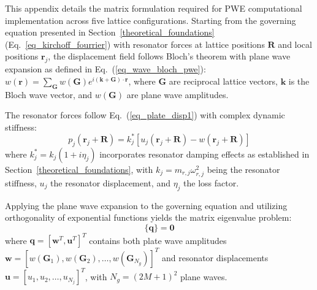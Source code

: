 \documentclass[review,numbers,sort&compress]{elsarticle}
\begin{document}
{This appendix details the matrix formulation required for PWE computational implementation across five lattice configurations. Starting from the governing equation presented in Section~\ref{theoretical_foundations} (Eq.~\ref{eq_kirchoff_fourrier}) with resonator forces at lattice positions $\mathbf{R}$ and local positions $\mathbf{r}_j$, the displacement field follows Bloch's theorem with plane wave expansion as defined in Eq.~(\ref{eq_wave_bloch_pwe}): $w(\mathbf{r}) = \sum_{\mathbf{G}} w(\mathbf{G}) e^{i(\mathbf{k}+\mathbf{G}) \cdot \mathbf{r}}$, where $\mathbf{G}$ are reciprocal lattice vectors, $\mathbf{k}$ is the Bloch wave vector, and $w(\mathbf{G})$ are plane wave amplitudes.

The resonator forces follow Eq.~(\ref{eq_plate_disp1}) with complex dynamic stiffness:
\begin{equation}
p_j(\mathbf{r}_j + \mathbf{R}) = k_j^*[u_j(\mathbf{r}_j + \mathbf{R}) - w(\mathbf{r}_j + \mathbf{R})]
\label{eq:resonator_force_app}
\end{equation}
where $k_j^* = k_j(1 + i\eta_j)$ incorporates resonator damping effects as established in Section~\ref{theoretical_foundations}, with $k_j = m_{r,j}\omega_{r,j}^2$ being the resonator stiffness, $u_j$ the resonator displacement, and $\eta_j$ the loss factor.

Applying the plane wave expansion to the governing equation and utilizing orthogonality of exponential functions yields the matrix eigenvalue problem:
\begin{equation}
[\mathbf{K}-\omega^{2}\mathbf{M}]\bigl\{ \mathbf{q} \bigr\} = \mathbf{0}
\label{eq:pwe_eigenvalue_app}
\end{equation}
where $\mathbf{q} = [\mathbf{w}^T, \mathbf{u}^T]^T$ contains both plate wave amplitudes $\mathbf{w} = [w(\mathbf{G}_1), w(\mathbf{G}_2), \ldots, w(\mathbf{G}_{N_g})]^T$ and resonator displacements $\mathbf{u} = [u_1, u_2, \ldots, u_{N_j}]^T$, with $N_g = (2M+1)^2$ plane waves.

}
\end{document}
